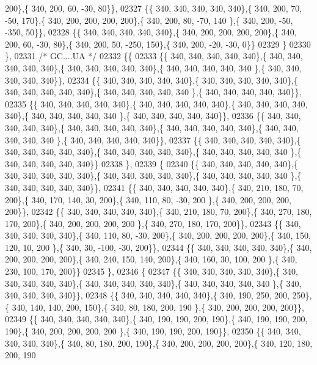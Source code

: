 \begin{DoxyCode}
      200\},\{ 340, 200,  60, -30,  80\}\},
02327 \{\{ 340, 340, 340, 340, 340\},\{ 340, 200,  70, -50, 170\},\{ 340, 200, 200, 200, 200\},\{ 340, 200,  80, -70, 140
      \},\{ 340, 200, -50, -350,  50\}\},
02328 \{\{ 340, 340, 340, 340, 340\},\{ 340, 200, 200, 200, 200\},\{ 340, 200,  60, -30,  80\},\{ 340, 200,  50, -250, 
      150\},\{ 340, 200, -20, -30,   0\}\}
02329 \}
02330 \},
02331 \textcolor{comment}{/* GC....UA */}
02332 \{\{
02333 \{\{ 340, 340, 340, 340, 340\},\{ 340, 340, 340, 340, 340\},\{ 340, 340, 340, 340, 340\},\{ 340, 340, 340, 340, 340
      \},\{ 340, 340, 340, 340, 340\}\},
02334 \{\{ 340, 340, 340, 340, 340\},\{ 340, 340, 340, 340, 340\},\{ 340, 340, 340, 340, 340\},\{ 340, 340, 340, 340, 340
      \},\{ 340, 340, 340, 340, 340\}\},
02335 \{\{ 340, 340, 340, 340, 340\},\{ 340, 340, 340, 340, 340\},\{ 340, 340, 340, 340, 340\},\{ 340, 340, 340, 340, 340
      \},\{ 340, 340, 340, 340, 340\}\},
02336 \{\{ 340, 340, 340, 340, 340\},\{ 340, 340, 340, 340, 340\},\{ 340, 340, 340, 340, 340\},\{ 340, 340, 340, 340, 340
      \},\{ 340, 340, 340, 340, 340\}\},
02337 \{\{ 340, 340, 340, 340, 340\},\{ 340, 340, 340, 340, 340\},\{ 340, 340, 340, 340, 340\},\{ 340, 340, 340, 340, 340
      \},\{ 340, 340, 340, 340, 340\}\}
02338 \},
02339 \{
02340 \{\{ 340, 340, 340, 340, 340\},\{ 340, 340, 340, 340, 340\},\{ 340, 340, 340, 340, 340\},\{ 340, 340, 340, 340, 340
      \},\{ 340, 340, 340, 340, 340\}\},
02341 \{\{ 340, 340, 340, 340, 340\},\{ 340, 210, 180,  70, 200\},\{ 340, 170, 140,  30, 200\},\{ 340, 110,  80, -30, 200
      \},\{ 340, 200, 200, 200, 200\}\},
02342 \{\{ 340, 340, 340, 340, 340\},\{ 340, 210, 180,  70, 200\},\{ 340, 270, 180, 170, 200\},\{ 340, 200, 200, 200, 200
      \},\{ 340, 270, 180, 170, 200\}\},
02343 \{\{ 340, 340, 340, 340, 340\},\{ 340, 110,  80, -30, 200\},\{ 340, 200, 200, 200, 200\},\{ 340, 150, 120,  10, 200
      \},\{ 340,  30, -100, -30, 200\}\},
02344 \{\{ 340, 340, 340, 340, 340\},\{ 340, 200, 200, 200, 200\},\{ 340, 240, 150, 140, 200\},\{ 340, 160,  30, 100, 200
      \},\{ 340, 230, 100, 170, 200\}\}
02345 \},
02346 \{
02347 \{\{ 340, 340, 340, 340, 340\},\{ 340, 340, 340, 340, 340\},\{ 340, 340, 340, 340, 340\},\{ 340, 340, 340, 340, 340
      \},\{ 340, 340, 340, 340, 340\}\},
02348 \{\{ 340, 340, 340, 340, 340\},\{ 340, 190, 250, 200, 250\},\{ 340, 140, 140, 200, 150\},\{ 340,  80, 180, 200, 190
      \},\{ 340, 200, 200, 200, 200\}\},
02349 \{\{ 340, 340, 340, 340, 340\},\{ 340, 190, 190, 200, 190\},\{ 340, 190, 190, 200, 190\},\{ 340, 200, 200, 200, 200
      \},\{ 340, 190, 190, 200, 190\}\},
02350 \{\{ 340, 340, 340, 340, 340\},\{ 340,  80, 180, 200, 190\},\{ 340, 200, 200, 200, 200\},\{ 340, 120, 180, 200, 190

\end{DoxyCode}

